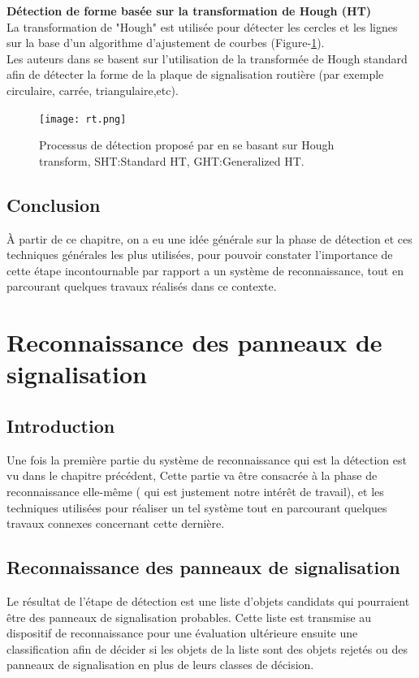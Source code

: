 {\textbf{Détection de forme basée sur la transformation de Hough (HT)}}\\

La transformation de "Hough" est utilisée pour détecter les cercles et les lignes sur la base d'un algorithme d'ajustement de courbes (Figure-\ref{fig:ht}).\\

Les auteurs dans \cite{22} se basent sur l'utilisation de la transformée de Hough standard afin de détecter la forme de la plaque de signalisation routière (par exemple circulaire, carrée, triangulaire,etc).
\begin{figure}[h]
      \centering
      \texttt{[image: rt.png]}
    \caption{Processus de détection proposé par \cite{22} en se basant sur Hough transform, SHT:Standard HT, GHT:Generalized HT.}
    \label{fig:ht}
\end{figure}

\section{Conclusion}

À partir de ce chapitre, on a eu une idée générale sur la phase de détection et ces techniques générales les plus utilisées, pour pouvoir constater l'importance de cette étape incontournable par rapport a un système de reconnaissance, tout en parcourant quelques travaux réalisés dans ce contexte.

\chapter{Reconnaissance des panneaux de signalisation}
\minitoc
\section{Introduction}
Une fois la première partie du système de reconnaissance qui est la détection est vu dans le chapitre précédent, Cette partie va être consacrée à la phase de reconnaissance elle-même ( qui est justement notre intérêt de travail), et les techniques utilisées pour réaliser un tel système tout en parcourant quelques travaux connexes concernant cette dernière.

\section{Reconnaissance des panneaux de signalisation}

Le résultat de l’étape de détection est une liste d’objets candidats qui pourraient être des panneaux de signalisation probables. Cette liste est transmise au dispositif de reconnaissance pour une évaluation ultérieure ensuite une classification afin de décider si les objets de la liste sont des objets rejetés ou des panneaux de signalisation en plus de leurs classes de décision.

